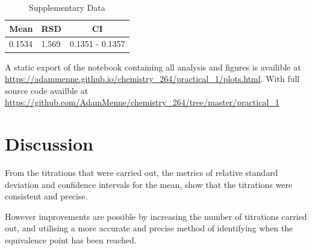 \documentclass[a4paper, british]{article}
\begin{document}
\vspace{25mm}

\begin{table}[h]
    \centering
    \caption{Supplementary Data}
    \begin{tabular}{llc}
        \addlinespace
        \toprule
        Mean & RSD & CI\\ 
        \midrule
        0.1534 & 1.569 & 0.1351 - 0.1357 \\
        \bottomrule
        \end{tabular}
        \label{table:data}   
\end{table}

A static export of the notebook containing all analysis and figures is availible at \url{https://adammenne.github.io/chemistry_264/practical_1/plots.html}. With full source code availble at \url{https://github.com/AdamMenne/chemistry_264/tree/master/practical_1}

\section{Discussion}

From the titrations that were carried out, the metrics of relative standard deviation and confidence intervals for the mean, show that the titrations were consistent and precise. 

However improvements are possible by increasing the number of titrations carried out, and utilising a more accurate and precise method of identifying when the equivalence point has been reached.

\newpage
\end{document}
